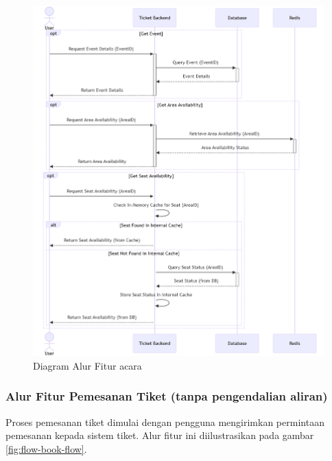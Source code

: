\begin{figure}[h]
    \centering
    \includegraphics[width=1\textwidth]{resources/chapter-3/event-flow.png}
    \caption{Diagram Alur Fitur acara}
    \label{fig:flow-event}
\end{figure}

\pagebreak

\subsubsection{Alur Fitur Pemesanan Tiket (tanpa pengendalian aliran)}

Proses pemesanan tiket dimulai dengan pengguna mengirimkan permintaan pemesanan kepada sistem tiket. Alur fitur ini diilustrasikan pada gambar \ref{fig:flow-book-flow}.

